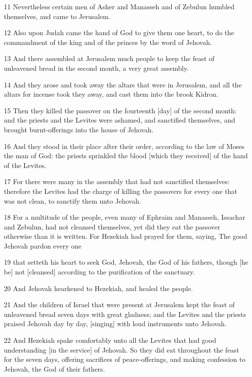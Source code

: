 \par 11 Nevertheless certain men of Asher and Manasseh and of Zebulun humbled themselves, and came to Jerusalem.
\par 12 Also upon Judah came the hand of God to give them one heart, to do the commandment of the king and of the princes by the word of Jehovah.
\par 13 And there assembled at Jerusalem much people to keep the feast of unleavened bread in the second month, a very great assembly.
\par 14 And they arose and took away the altars that were in Jerusalem, and all the altars for incense took they away, and cast them into the brook Kidron.
\par 15 Then they killed the passover on the fourteenth [day] of the second month: and the priests and the Levites were ashamed, and sanctified themselves, and brought burnt-offerings into the house of Jehovah.
\par 16 And they stood in their place after their order, according to the law of Moses the man of God: the priests sprinkled the blood [which they received] of the hand of the Levites.
\par 17 For there were many in the assembly that had not sanctified themselves: therefore the Levites had the charge of killing the passovers for every one that was not clean, to sanctify them unto Jehovah.
\par 18 For a multitude of the people, even many of Ephraim and Manasseh, Issachar and Zebulun, had not cleansed themselves, yet did they eat the passover otherwise than it is written. For Hezekiah had prayed for them, saying, The good Jehovah pardon every one
\par 19 that setteth his heart to seek God, Jehovah, the God of his fathers, though [he be] not [cleansed] according to the purification of the sanctuary.
\par 20 And Jehovah hearkened to Hezekiah, and healed the people.
\par 21 And the children of Israel that were present at Jerusalem kept the feast of unleavened bread seven days with great gladness; and the Levites and the priests praised Jehovah day by day, [singing] with loud instruments unto Jehovah.
\par 22 And Hezekiah spake comfortably unto all the Levites that had good understanding [in the service] of Jehovah. So they did eat throughout the feast for the seven days, offering sacrifices of peace-offerings, and making confession to Jehovah, the God of their fathers.
